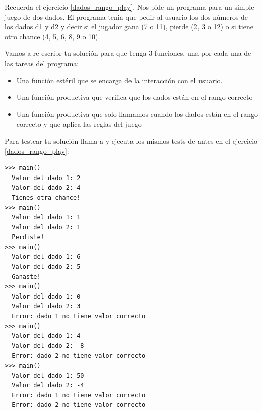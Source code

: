 \begin{ejercicio}\label{dados_rango_play_funciones}
Recuerda el ejercicio \ref{dados_rango_play}. Nos pide un programa para un simple juego de dos dados. El programa tenia que pedir al usuario los dos números de los dados d1 y d2 y decir si el jugador gana (7 o 11), pierde (2, 3 o 12) o si tiene otro chance (4, 5, 6, 8, 9 o 10).

Vamos a re-escribr tu solución para que tenga 3 funciones, una por cada una de las tareas del programa:

\begin{itemize}
    \item Una función estéril  que se encarga de la interacción con el usuario.
    \item Una función productiva  que verifica que los dados están en el rango correcto
    \item Una función productiva  que solo llamamos cuando los dados están en el rango correcto y que aplica las reglas del juego
\end{itemize}

Para testear tu solución llama a  y ejecuta los mismos tests de antes en el ejercicio \ref{dados_rango_play}:\\


\begin{Verbatim}[frame=single, label={\em example test execution of the program}]
>>> main()
  Valor del dado 1: 2
  Valor del dado 2: 4
  Tienes otra chance!
>>> main()
  Valor del dado 1: 1
  Valor del dado 2: 1
  Perdiste!
>>> main()
  Valor del dado 1: 6
  Valor del dado 2: 5
  Ganaste!
>>> main() 
  Valor del dado 1: 0
  Valor del dado 2: 3
  Error: dado 1 no tiene valor correcto
>>> main() 
  Valor del dado 1: 4
  Valor del dado 2: -8
  Error: dado 2 no tiene valor correcto
>>> main() 
  Valor del dado 1: 50
  Valor del dado 2: -4
  Error: dado 1 no tiene valor correcto
  Error: dado 2 no tiene valor correcto
\end{Verbatim}

\end{ejercicio}



